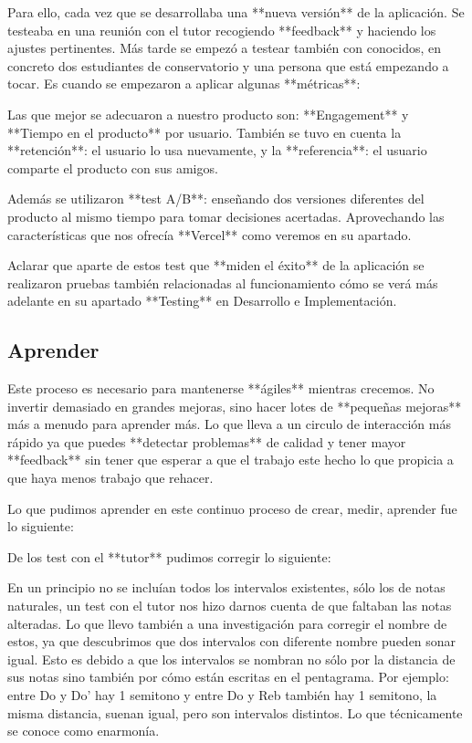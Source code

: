 \documentclass[12pt,twoside,titlepage]{report}
\begin{document}
Para ello, cada vez que se desarrollaba una **nueva versión** de la aplicación. Se testeaba en una reunión con el tutor recogiendo **feedback** y haciendo los ajustes pertinentes. Más tarde se empezó a testear también con conocidos, en concreto dos estudiantes de conservatorio y una persona que está empezando a tocar. Es cuando se empezaron a aplicar algunas **métricas**:

Las que mejor se adecuaron a nuestro producto son: **Engagement** y **Tiempo en el producto** por usuario. También se tuvo en cuenta la **retención**: el usuario lo usa nuevamente, y la **referencia**: el usuario comparte el producto con sus amigos.

Además se utilizaron **test A/B**: enseñando dos versiones diferentes del producto al mismo tiempo para tomar decisiones acertadas. Aprovechando las características que nos ofrecía **Vercel** como veremos en su apartado.

Aclarar que aparte de estos test que **miden el éxito** de la aplicación se realizaron pruebas también relacionadas al funcionamiento cómo se verá más adelante en su apartado **Testing** en Desarrollo e Implementación.

\subsection{Aprender}

Este proceso es necesario para mantenerse **ágiles** mientras crecemos. No invertir demasiado en grandes mejoras, sino hacer lotes de **pequeñas mejoras** más a menudo para aprender más. Lo que lleva a un circulo de interacción más rápido ya que puedes **detectar problemas** de calidad y tener mayor **feedback** sin tener que esperar a que el trabajo este hecho lo que propicia a que haya menos trabajo que rehacer.

Lo que pudimos aprender en este continuo proceso de crear, medir, aprender fue lo siguiente:

De los test con el **tutor** pudimos corregir lo siguiente:

En un principio no se incluían todos los intervalos existentes, sólo los de notas naturales, un test con el tutor nos hizo darnos cuenta de que faltaban las notas alteradas. Lo que llevo también a una investigación para corregir el nombre de estos, ya que descubrimos que dos intervalos con diferente nombre pueden sonar igual. Esto es debido a que los intervalos se nombran no sólo por la distancia de sus notas sino también por cómo están escritas en el pentagrama. Por ejemplo: entre Do y Do' hay 1 semitono y entre Do y Reb también hay 1 semitono, la misma distancia, suenan igual, pero son intervalos distintos. Lo que técnicamente se conoce como enarmonía.
\end{document}
